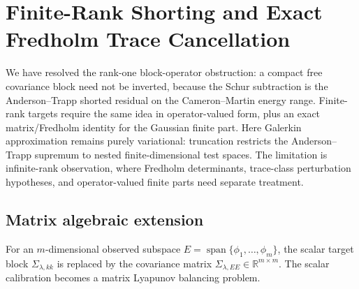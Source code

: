     \section{Finite-Rank Shorting and Exact Fredholm Trace Cancellation}
    \label{sec:finite_rank}
    \label{sec:discussion}

We have resolved the rank-one block-operator obstruction: a compact
free covariance block need not be inverted, because the Schur subtraction is
the Anderson--Trapp shorted residual on the Cameron--Martin energy range.
Finite-rank targets require the same idea in operator-valued form, plus an
exact matrix/Fredholm identity for the Gaussian finite part.  Here Galerkin
approximation remains purely variational: truncation restricts the
Anderson--Trapp supremum to nested finite-dimensional test spaces.  The
limitation is infinite-rank observation, where Fredholm
determinants, trace-class perturbation hypotheses, and operator-valued finite
parts need separate treatment.

\subsection{Matrix algebraic extension}
\label{sec:finite_rank:matrix_extension}

For an $m$-dimensional observed subspace $E=\operatorname{span}\{\phi_1,\ldots,\phi_m\}$, the scalar target block $\Sigma_{\lambda,kk}$ is replaced by the covariance matrix $\Sigma_{\lambda,EE}\in\mathbb{R}^{m\times m}$. The scalar calibration becomes a matrix Lyapunov balancing problem.

